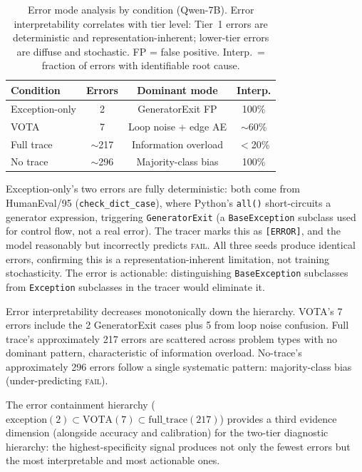 \documentclass[11pt,a4paper]{article}
\begin{document}
\begin{table}[t]
\centering
\small
\begin{tabular}{lccc}
\toprule
\textbf{Condition} & \textbf{Errors} & \textbf{Dominant mode} & \textbf{Interp.} \\
\midrule
Exception-only & 2 & GeneratorExit FP & 100\% \\
VOTA & 7 & Loop noise + edge AE & $\sim$60\% \\
Full trace & $\sim$217 & Information overload & $<$20\% \\
No trace & $\sim$296 & Majority-class bias & 100\% \\
\bottomrule
\end{tabular}
\caption{Error mode analysis by condition (Qwen-7B). Error interpretability correlates with tier level: Tier~1 errors are deterministic and representation-inherent; lower-tier errors are diffuse and stochastic. FP = false positive. Interp.\ = fraction of errors with identifiable root cause.}
\label{tab:errors}
\end{table}

Exception-only's two errors are fully deterministic: both come from HumanEval/95 (\texttt{check\_dict\_case}), where Python's \texttt{all()} short-circuits a generator expression, triggering \texttt{GeneratorExit} (a \texttt{BaseException} subclass used for control flow, not a real error). The tracer marks this as \texttt{[ERROR]}, and the model reasonably but incorrectly predicts \textsc{fail}. All three seeds produce identical errors, confirming this is a representation-inherent limitation, not training stochasticity. The error is actionable: distinguishing \texttt{BaseException} subclasses from \texttt{Exception} subclasses in the tracer would eliminate it.

Error interpretability decreases monotonically down the hierarchy. VOTA's 7 errors include the 2 GeneratorExit cases plus 5 from loop noise confusion. Full trace's approximately 217 errors are scattered across problem types with no dominant pattern, characteristic of information overload. No-trace's approximately 296 errors follow a single systematic pattern: majority-class bias (under-predicting \textsc{fail}).

The error containment hierarchy ($\text{exception}(2) \subset \text{VOTA}(7) \subset \text{full\_trace}(217)$) provides a third evidence dimension (alongside accuracy and calibration) for the two-tier diagnostic hierarchy: the highest-specificity signal produces not only the fewest errors but the most interpretable and most actionable ones.
\end{document}
